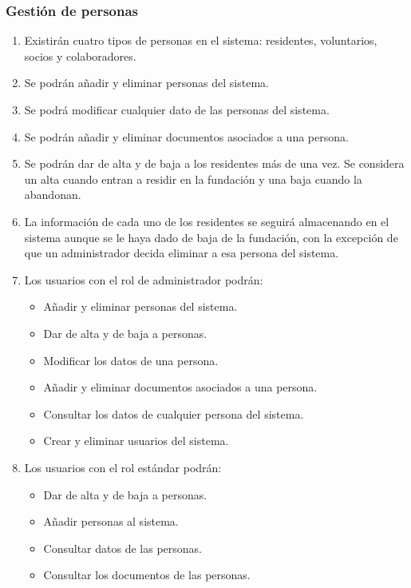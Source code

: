 \subsubsection{Gestión de personas}

\begin{enumerate}[start=9,label={RF-\arabic*.}]

    \item Existirán cuatro tipos de personas en el sistema: residentes, voluntarios, socios y colaboradores.
    \item Se podrán añadir y eliminar personas del sistema.
    \item Se podrá modificar cualquier dato de las personas del sistema.
    \item Se podrán añadir y eliminar documentos asociados a una persona.
    \item Se podrán dar de alta y de baja a los residentes más de una vez. Se considera un alta cuando entran a residir en la fundación y una baja cuando la abandonan.
    \item La información de cada uno de los residentes se seguirá almacenando en el sistema aunque se le haya dado de baja de la fundación, con la excepción de que un administrador decida eliminar a esa persona del sistema. 
    \item Los usuarios con el rol de administrador podrán:
    \begin{itemize}
        \item Añadir y eliminar personas del sistema.
        \item Dar de alta y de baja a personas.
        \item Modificar los datos de una persona.
        \item Añadir y eliminar documentos asociados a una persona.
        \item Consultar los datos de cualquier persona del sistema.
        \item Crear y eliminar usuarios del sistema.
    \end{itemize}
    \item Los usuarios con el rol estándar podrán:
        \begin{itemize}
            \item Dar de alta y de baja a personas.
            \item Añadir personas al sistema.
            \item Consultar datos de las personas.
            \item Consultar los documentos de las personas.

\end{itemize}
\end{enumerate}
